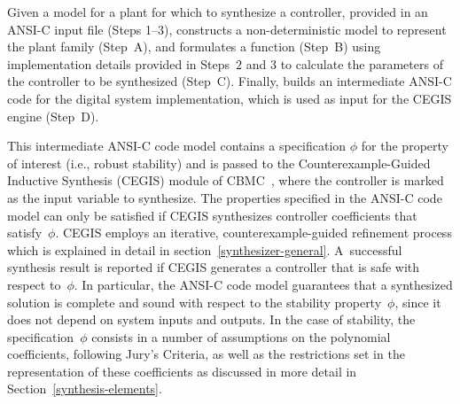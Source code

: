 \documentclass{sig-alternate-05-2015}
\begin{document}
Given a model for a plant for which to synthesize a controller, provided in
an ANSI-C input file (Steps 1--3), \tool constructs a non-deterministic
model to represent the plant family (Step~A), and formulates a function
(Step~B) using implementation details provided in Steps~$2$ and $3$ to
calculate the parameters of the controller to be synthesized (Step~C). 
Finally, \tool builds an intermediate ANSI-C code for the digital system
implementation, which is used as input for the CEGIS engine (Step~D).

This intermediate ANSI-C code model contains a specification $\phi$ for the
property of interest (i.e., robust stability) and is passed to the
Counterexample-Guided Inductive Synthesis (CEGIS) module of
CBMC~\cite{ClarkeKL04}, where the controller is marked as the input variable
to synthesize.  The properties specified in the ANSI-C code model can only
be satisfied if CEGIS synthesizes controller coefficients that
satisfy~$\phi$.  CEGIS employs an iterative, counterexample-guided
refinement process which is explained in detail in
section~\ref{synthesizer-general}.  A~successful synthesis result is
reported if CEGIS generates a controller that is safe with respect to~$\phi$. 
In particular, the ANSI-C code model guarantees that a synthesized solution
is complete and sound with respect to the stability property~$\phi$, since it
does not depend on system inputs and outputs.  In the case of stability, the
specification~$\phi$ consists in a number of assumptions on the polynomial
coefficients, following Jury's Criteria, as well as the restrictions set in
the representation of these coefficients as discussed in more detail in 
Section~\ref{synthesis-elements}.

\end{document}
